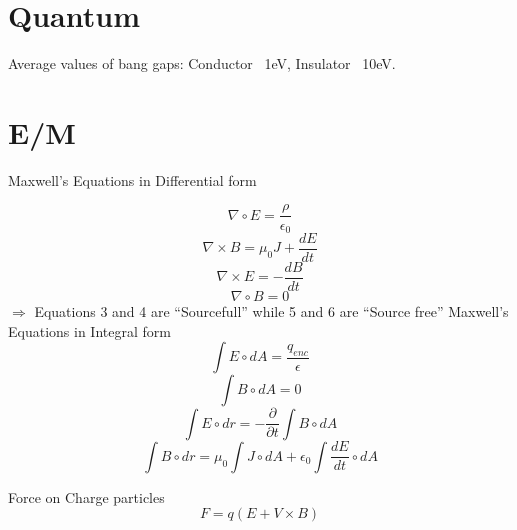 \documentclass{article}
\begin{document}
\section{Quantum}
Average values of bang gaps: Conductor ~1eV, Insulator ~10eV.










\section{E/M}
Maxwell's Equations in Differential form 


\begin{equation}\nabla \circ E=\frac{\rho}{\epsilon_0}\end{equation}
\begin{equation}\nabla \times B=\mu_0 J + \frac{dE}{dt}\end{equation}
\begin{equation}\nabla \times E=-\frac{dB}{dt}\end{equation}
\begin{equation}\nabla \circ B=0\end{equation}
$\Rightarrow$ Equations 3 and 4 are ``Sourcefull'' while 5 and 6 are ``Source free''
Maxwell's Equations in Integral form
\begin{equation}\int E \circ dA=\frac{q_{enc}}{\epsilon}\end{equation}
\begin{equation}\int B \circ dA=0\end{equation}
\begin{equation}\int E \circ dr=-\frac{\partial}{\partial t}\int B \circ dA \end{equation}
\begin{equation}\int B \circ dr=\mu_0 \int J \circ dA + \epsilon_0 \int \frac{dE}{dt}\circ dA\end{equation}

Force on Charge particles\begin{equation}F=q(E+V\times B)\end{equation}
\end{document}
